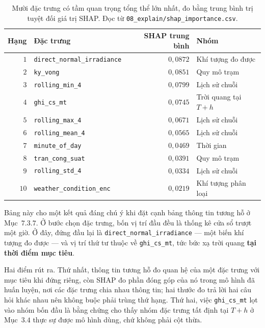 \documentclass[12pt, a4paper]{report}
\begin{document}
\begin{table}[htbp]
\centering
\caption{Mười đặc trưng có tầm quan trọng tổng thể lớn nhất, đo bằng trung bình trị tuyệt đối
giá trị SHAP. Đọc từ \texttt{08\_explain/shap\_importance.csv}.}
\label{tab:shap_global}
\small
\begin{tabular}{r l r l}
\toprule
\textbf{Hạng} & \textbf{Đặc trưng} & \textbf{SHAP trung bình} & \textbf{Nhóm} \\
\midrule
$1$  & \texttt{direct\_normal\_irradiance} & $0{,}0872$ & Khí tượng đo được \\
$2$  & \texttt{ky\_vong}                  & $0{,}0851$ & Quy mô trạm \\
$3$  & \texttt{rolling\_min\_4}            & $0{,}0799$ & Lịch sử chuỗi \\
$4$  & \texttt{ghi\_cs\_mt}                & $0{,}0745$ & Trời quang tại $T{+}h$ \\
$5$  & \texttt{rolling\_max\_4}            & $0{,}0671$ & Lịch sử chuỗi \\
$6$  & \texttt{rolling\_mean\_4}           & $0{,}0565$ & Lịch sử chuỗi \\
$7$  & \texttt{minute\_of\_day}            & $0{,}0469$ & Thời gian \\
$8$  & \texttt{tran\_cong\_suat}           & $0{,}0391$ & Quy mô trạm \\
$9$  & \texttt{rolling\_std\_4}            & $0{,}0334$ & Lịch sử chuỗi \\
$10$ & \texttt{weather\_condition\_enc}    & $0{,}0219$ & Khí tượng phân loại \\
\bottomrule
\end{tabular}
\end{table}

Bảng này cho một kết quả đáng chú ý khi đặt cạnh bảng thông tin tương hỗ ở Mục~$7.3.7$. Ở bước
chọn đặc trưng, bốn vị trí đầu đều là thống kê cửa sổ trượt một giờ. Ở đây, đứng đầu lại là
\texttt{direct\_normal\_irradiance} --- một biến khí tượng đo được --- và vị trí thứ tư thuộc về
\texttt{ghi\_cs\_mt}, tức bức xạ trời quang \textbf{tại thời điểm mục tiêu}.

Hai điểm rút ra. Thứ nhất, thông tin tương hỗ đo quan hệ của một đặc trưng với mục tiêu khi
đứng riêng, còn SHAP đo phần đóng góp của nó trong mô hình đã huấn luyện, nơi các đặc
trưng chia nhau thông tin; hai thước đo trả lời hai câu hỏi khác nhau nên không buộc phải trùng
thứ hạng. Thứ hai, việc \texttt{ghi\_cs\_mt} lọt vào nhóm bốn đầu là bằng chứng cho thấy nhóm đặc
trưng tất định tại $T{+}h$ ở Mục~$3.4$ thực sự được mô hình dùng, chứ không phải cột thừa.
\end{document}
